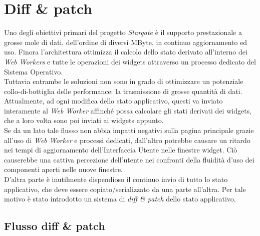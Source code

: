 
\chapter{Diff \& patch}
\label{cap:diff-patch}

Uno degli obiettivi primari del progetto \textit{Stargate} è il supporto prestazionale a grosse mole di dati, dell'ordine di diversi MByte, in continuo aggiornamento ed uso. Finora l'architettura ottimizza il calcolo dello stato derivato all'interno dei \textit{Web Workers} e tutte le operazioni dei widgets attraverso un processo dedicato del Sistema Operativo. \\

Tuttavia entrambe le soluzioni non sono in grado di ottimizzare un potenziale collo-di-bottiglia delle performance: la trasmissione di grosse quantità di dati. Attualmente, ad ogni modifica dello stato applicativo, questi va inviato interamente al \textit{Web Worker} affinché possa calcolare gli stati derivati dei widgets, che a loro volta sono poi inviati ai widgets appunto. \\

Se da un lato tale flusso non abbia impatti negativi sulla pagina principale grazie all'uso di \textit{Web Worker} e processi dedicati, dall'altro potrebbe causare un ritardo nei tempi di aggiornamento dell'Interfaccia Utente nelle finestre widget. Ciò causerebbe una cattiva percezione dell'utente nei confronti della fluidità d'uso dei componenti aperti nelle nuove finestre. \\

D'altra parte è inutilmente dispendioso il continuo invio di tutto lo stato applicativo, che deve essere copiato/serializzato da una parte all'altra. Per tale motivo è stato introdotto un sistema di \textit{diff \& patch} dello stato applicativo.

\section{Flusso diff \& patch}

